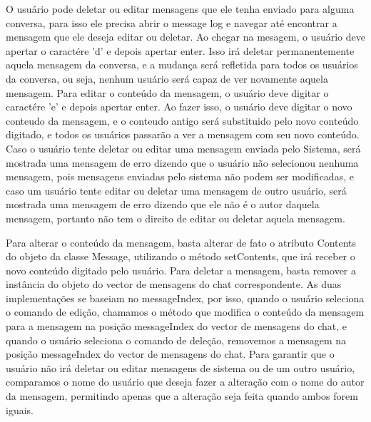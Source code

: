 \documentclass[../main.tex]{subfiles}
\begin{document}
O usuário pode deletar ou editar mensagens que ele tenha enviado para alguma conversa, para isso ele precisa abrir o message log e navegar até encontrar a mensagem que ele deseja editar ou deletar. Ao chegar na mesagem, o usuário deve apertar o caractére 'd' e depois apertar enter. Isso irá deletar permanentemente aquela mensagem da conversa, e a mudança será refletida para todos os usuários da conversa, ou seja, nenhum usuário será capaz de ver novamente aquela mensagem. Para editar o conteúdo da mensagem, o usuário deve digitar o caractére 'e' e depois apertar enter. Ao fazer isso, o usuário deve digitar o novo conteudo da mensagem, e o conteudo antigo será substituido pelo novo conteúdo digitado, e todos os usuários passarão a ver a mensagem com seu novo conteúdo. Caso o usuário tente deletar ou editar uma mensagem enviada pelo Sistema, será mostrada uma mensagem de erro dizendo que o usuário não selecionou nenhuma mensagem, pois mensagens enviadas pelo sistema não podem ser modificadas, e caso um usuário tente editar ou deletar uma mensagem de outro usuário, será mostrada uma mensagem de erro dizendo que ele não é o autor daquela mensagem, portanto não tem o direito de editar ou deletar aquela mensagem.

Para alterar o conteúdo da mensagem, basta alterar de fato o atributo Contents do objeto da classe Message, utilizando o método setContents, que irá receber o novo conteúdo digitado pelo usuário. Para deletar a mensagem, basta remover a instância do objeto do vector de mensagens do chat correspondente. As duas implementações se baseiam no messageIndex, por isso, quando o usuário seleciona o comando de edição, chamamos o método que modifica o conteúdo da mensagem para a mensagem na posição messageIndex do vector de mensagens do chat, e quando o usuário seleciona o comando de deleção, removemos a mensagem na posição messageIndex do vector de mensagens do chat. Para garantir que o usuário não irá deletar ou editar mensagens de sistema ou de um outro usuário, comparamos o nome do usuário que deseja fazer a alteração com o nome do autor da mensagem, permitindo apenas que a alteração seja feita quando ambos forem iguais.
\end{document}
